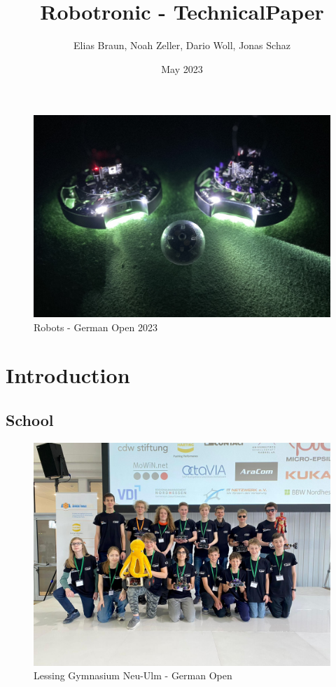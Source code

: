 \documentclass{scrartcl}
\title{Robotronic - TechnicalPaper}
\author{Elias Braun, Noah Zeller, Dario Woll, Jonas Schaz}
\date{May 2023}
\begin{document}
\maketitle

\begin{figure}[h]
    \centering
    \includegraphics[width=\textwidth]{img/Robotronic-Robots.JPEG}
    \caption{Robots - German Open 2023}
    \label{fig:robots}
\end{figure}
\newpage

\tableofcontents
\newpage

\section{Introduction}

\subsection{School}
\begin{figure}[ht]
    \centering
    \includegraphics[width=\textwidth]{img/LGNU.jpg}
    \caption{Lessing Gymnasium Neu-Ulm - German Open}
    \label{fig:LGNU}
\end{figure}
\end{document}
